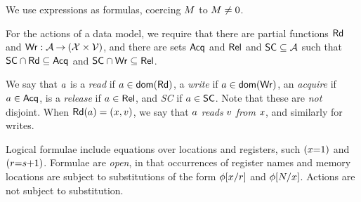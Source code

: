 We use expressions as formulas, coercing $M$ to $M\neq 0$.

For the actions of a data model, we require that
  there are partial functions $\mathsf{Rd}$ and
  $\mathsf{Wr}: \mathcal{A} \mathbin\rightarrow (\mathcal{X} \times \mathcal{V})$, and
  there are sets $\mathsf{Acq}$ and $\mathsf{Rel}$ and $\mathsf{SC} \subseteq\mathcal{A}$ such that
  $\mathsf{SC}\cap\mathsf{Rd}\subseteq\mathsf{Acq}$ and
  $\mathsf{SC}\cap\mathsf{Wr}\subseteq\mathsf{Rel}$. %

%
%
  We say that $a$ is a \emph{read} if $a\in\mathsf{dom}(\mathsf{Rd})$, a
  \emph{write} if $a\in\mathsf{dom}(\mathsf{Wr})$, an \emph{acquire} if
  $a\in\mathsf{Acq}$, is a \emph{release} if $a\in\mathsf{Rel}$, and \emph{SC} if
  $a\in\mathsf{SC}$.  Note that these are \emph{not} disjoint.
When $\mathsf{Rd}(a) = (x,v)$, we say that $a$ \emph{reads}
$v$ \emph{from} $x$, and similarly for writes.



Logical formulae include equations over locations and registers, such
$(x{=}1)$ and $(r{=}s{+}1)$.  Formulae are \emph{open}, in that
occurrences of register names and memory locations are subject to
substitutions of the form $\phi[x/r]$ and $\phi[N/x]$.
Actions are not subject to substitution.


